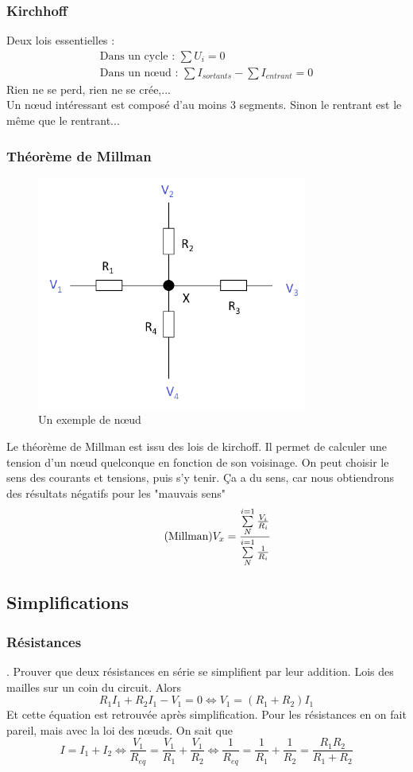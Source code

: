 \documentclass[12pt,a4paper]{article}
\begin{document}
\subsubsection{Kirchhoff}
Deux lois essentielles :
\begin{align}
	\text{Dans un cycle : } \sum U_i = 0\\
	\text{Dans un n\oe ud : } \sum I_{sortants} - \sum I_{entrant} = 0
\end{align}
Rien ne se perd, rien ne se crée,...\\
Un n\oe ud intéressant est composé d'au moins 3 segments. Sinon le rentrant est le même que le rentrant...
\subsubsection{Théorème de Millman}
\begin{figure}
\centering
\captionsetup{justification=centering}
\includegraphics[scale=0.7]{images/millman}
\caption{Un exemple de n\oe ud}
\end{figure}
Le théorème de Millman est issu des lois de kirchoff. Il permet de calculer une tension d'un n\oe ud quelconque en fonction de son voisinage. On peut choisir le sens des courants et tensions, puis s'y tenir. Ça a du sens, car nous obtiendrons des résultats négatifs pour les "mauvais sens"
\begin{equation}
\tag{Millman}
V_x = \frac{\somme{i=1}{N} \frac{V_i}{R_i}}{\somme{i=1}{N}\frac{1}{R_i}}
\end{equation}

\subsection{Simplifications}
\subsubsection{Résistances}
. Prouver que deux résistances en série se simplifient par leur addition. Lois des mailles sur un coin du circuit. Alors 
\begin{equation*}
	R_1I_1 + R_2I_1 - V_1 = 0 \iff V_1 = (R_1+R_2)I_1
\end{equation*}
Et cette équation est retrouvée après simplification. Pour les résistances en  on fait pareil, mais avec la loi des n\oe uds. On sait que 
\[I = I_1 + I_2 \iff \frac{V_1}{R_{eq}} = \frac{V_1}{R_1} + \frac{V_1}{R_2} \iff \frac{1}{R_{eq}} = \frac{1}{R_1} + \frac{1}{R_2} = \frac{R_1R_2}{R_1+R_2}\]
\end{document}
